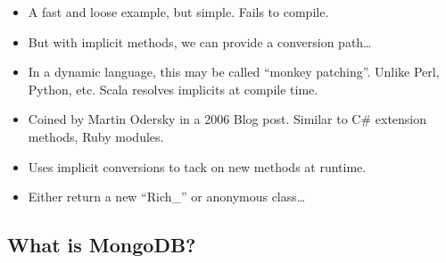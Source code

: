 \documentclass{beamer}
\newenvironment{itemizeframe}
               {\begin{frame}\startitemizeframe} 
               {\stopitemizeframe\end{frame}}
\newcommand\startitemizeframe{\begin{itemize}} \newcommand\stopitemizeframe{\end{itemize}}
\begin{document}
\begin{itemizeframe}
\begin{itemizeframe}
\begin{itemize}
            \item<2-> A fast and loose example, but simple.  Fails to compile.
            \item<3-> But with implicit methods, we can provide a conversion path\ldots
                
            \item<4-> In a dynamic language, this may be called ``monkey patching''. Unlike Perl, Python, etc. Scala resolves implicits at compile time.
        \end{itemize}
\end{itemizeframe}

\begin{itemizeframe}
    \frametitle{Pimp My Library}
    \item Coined by Martin Odersky in a 2006 Blog post.  Similar to C\# extension methods, Ruby modules.
    \item Uses implicit conversions to tack on new methods at runtime.
    \item Either return a new ``Rich\_'' or anonymous class\ldots
        
\end{itemizeframe}

\subsection{What is MongoDB?}


\end{itemizeframe}
\end{document}
